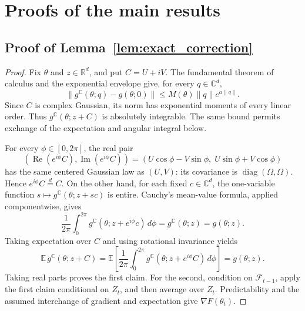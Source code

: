 \section{Proofs of the main results}\label{app:proofs}

\subsection{Proof of Lemma~\ref{lem:exact_correction}}
\begin{proof}
Fix $\theta$ and $z\in\mathbb R^d$, and put $C=U+iV$.
The fundamental theorem of calculus and the exponential envelope give, for every $q\in\mathbb C^d$,
\begin{equation}\label{eq:appendix_score_envelope}
\|g^{\mathbb C}(\theta;q)-g(\theta;0)\|
\le M(\theta)\|q\|e^{a\|q\|}.
\end{equation}
Since $C$ is complex Gaussian, its norm has exponential moments of every linear order. Thus $g^{\mathbb C}(\theta;z+C)$ is absolutely integrable. The same bound permits exchange of the expectation and angular integral below.

For every $\phi\in[0,2\pi]$, the real pair
\[
(\operatorname{Re}(e^{i\phi}C),\operatorname{Im}(e^{i\phi}C))
=(U\cos\phi-V\sin\phi,\;U\sin\phi+V\cos\phi)
\]
has the same centered Gaussian law as $(U,V)$: its covariance is $\operatorname{diag}(\Omega,\Omega)$. Hence $e^{i\phi}C\overset{d}=C$. On the other hand, for each fixed $c\in\mathbb C^d$, the one-variable function $s\mapsto g^{\mathbb C}(\theta;z+sc)$ is entire. Cauchy's mean-value formula, applied componentwise, gives
\[
\frac{1}{2\pi}\int_0^{2\pi}
g^{\mathbb C}(\theta;z+e^{i\phi}c)\,d\phi
=g^{\mathbb C}(\theta;z)=g(\theta;z).
\]
Taking expectation over $C$ and using rotational invariance yields
\[
\mathbb E\,g^{\mathbb C}(\theta;z+C)
=\mathbb E\!\left[\frac{1}{2\pi}\int_0^{2\pi}
g^{\mathbb C}(\theta;z+e^{i\phi}C)\,d\phi\right]
=g(\theta;z).
\]
Taking real parts proves the first claim. For the second, condition on $\mathcal F_{t-1}$, apply the first claim conditional on $Z_t$, and then average over $Z_t$. Predictability and the assumed interchange of gradient and expectation give $\nabla F(\theta_t)$.
\end{proof}

